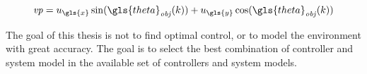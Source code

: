 \[ \mathit{vp} = u_{\gls{x}} \sin(\gls{theta}_{\mathit{obj}}(k)) + u_{\gls{y}}\cos(\gls{theta}_{\mathit{obj}}(k)) \]

The goal of this thesis is not to find optimal control, or to model the environment with great accuracy. The goal is to select the best combination of controller and system model in the available set of controllers and system models.



%
%

